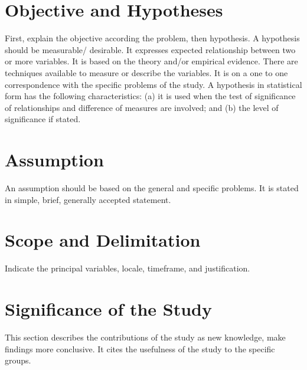 \section{Objective and Hypotheses}
First, explain the objective according the problem, then hypothesis. A hypothesis should be measurable/ desirable. It expresses expected relationship between two or more variables. It is based on the theory and/or empirical evidence. There are techniques available to measure or describe the variables. It is on a one to one correspondence with the specific problems of the study. A hypothesis in statistical form has the following characteristics: (a) it is used when the test of significance of relationships and difference of measures are involved; and (b) the level of significance if stated.

\section{Assumption}
An assumption should be based on the general and specific problems. It is stated in simple, brief, generally accepted statement.

\section{Scope and Delimitation}
Indicate the principal variables, locale, timeframe, and justification.

\section{Significance of the Study}
This section describes the contributions of the study as new knowledge, make findings more conclusive. It cites the usefulness of the study to the specific groups.
